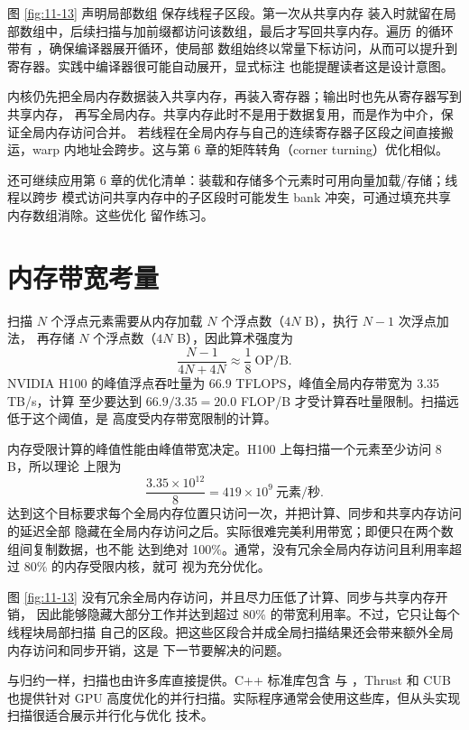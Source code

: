 图 \ref{fig:11-13} 声明局部数组  保存线程子区段。第一次从共享内存
装入时就留在局部数组中，后续扫描与加前缀都访问该数组，最后才写回共享内存。遍历
 的循环带有 ，确保编译器展开循环，使局部
数组始终以常量下标访问，从而可以提升到寄存器。实践中编译器很可能自动展开，显式标注
也能提醒读者这是设计意图。

内核仍先把全局内存数据装入共享内存，再装入寄存器；输出时也先从寄存器写到共享内存，
再写全局内存。共享内存此时不是用于数据复用，而是作为中介，保证全局内存访问合并。
若线程在全局内存与自己的连续寄存器子区段之间直接搬运，warp 内地址会跨步。这与第 6
章的矩阵转角（corner turning）优化相似。

还可继续应用第 6 章的优化清单：装载和存储多个元素时可用向量加载/存储；线程以跨步
模式访问共享内存中的子区段时可能发生 bank 冲突，可通过填充共享内存数组消除。这些优化
留作练习。

\section{内存带宽考量}
\label{sec:scan-memory-bandwidth}

扫描 $N$ 个浮点元素需要从内存加载 $N$ 个浮点数（$4N$ B），执行 $N-1$ 次浮点加法，
再存储 $N$ 个浮点数（$4N$ B），因此算术强度为
\[
  \frac{N-1}{4N+4N}\approx\frac18\ \text{OP/B}.
\]
NVIDIA H100 的峰值浮点吞吐量为 66.9 TFLOPS，峰值全局内存带宽为 3.35 TB/s，计算
至少要达到 $66.9/3.35=20.0$ FLOP/B 才受计算吞吐量限制。扫描远低于这个阈值，是
高度受内存带宽限制的计算。

内存受限计算的峰值性能由峰值带宽决定。H100 上每扫描一个元素至少访问 8 B，所以理论
上限为
\[
  \frac{3.35\times10^{12}}{8}=419\times10^9\ \text{元素/秒}.
\]
达到这个目标要求每个全局内存位置只访问一次，并把计算、同步和共享内存访问的延迟全部
隐藏在全局内存访问之后。实际很难完美利用带宽；即便只在两个数组间复制数据，也不能
达到绝对 100\%。通常，没有冗余全局内存访问且利用率超过 80\% 的内存受限内核，就可
视为充分优化。

图 \ref{fig:11-13} 没有冗余全局内存访问，并且尽力压低了计算、同步与共享内存开销，
因此能够隐藏大部分工作并达到超过 80\% 的带宽利用率。不过，它只让每个线程块局部扫描
自己的区段。把这些区段合并成全局扫描结果还会带来额外全局内存访问和同步开销，这是
下一节要解决的问题。

与归约一样，扫描也由许多库直接提供。C++ 标准库包含
 与 ，Thrust
\cite{ch11-bell2012thrust,ch11-nvidia-thrust2025} 和 CUB\cite{ch11-nvidia-cub2025} 也提供针对 GPU
高度优化的并行扫描。实际程序通常会使用这些库，但从头实现扫描很适合展示并行化与优化
技术。

